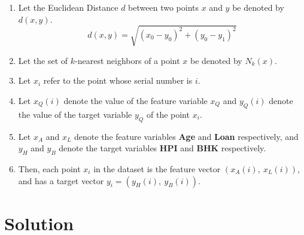 \documentclass[12pt]{article}
\begin{document}
    \begin{enumerate}
        \item Let the Euclidean Distance $d$ between two points $x$ and $y$ be denoted by $d(x, y)$.
            \begin{equation}
                d(x, y) = \sqrt{(x_{0} - y_{0})^{2} + (y_{0} - y_{1})^{2}}
            \end{equation}
        \item Let the set of $k$-nearest neighbors of a point $x$ be denoted by $N_{k}(x)$.
        \item Let $x_{i}$ refer to the point whose serial number is $i$.
        \item Let $x_{Q}(i)$ denote the value of the feature variable $x_{Q}$ and
        $y_{Q}(i)$ denote the value of the target variable $y_{Q}$ of the point $x_{i}$.
        \item Let $x_{A}$ and $x_{L}$ denote the feature variables \textbf{Age} and \textbf{Loan} respectively,
        and $y_{H}$ and $y_{B}$ denote the target variables \textbf{HPI} and \textbf{BHK} respectively.
        \item Then, each point $x_{i}$ in the dataset is the feature vector $(x_{A}(i), \ x_{L}(i))$,
        and has a target vector $y_{i} = (y_{H}(i), \ y_{B}(i))$.
    \end{enumerate}

    \section*{Solution}
\end{document}
